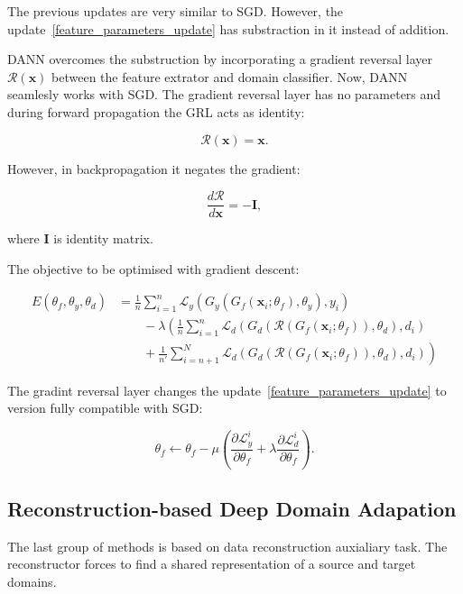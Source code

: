 The previous updates are very similar to SGD.
However, the update~\ref{feature_parameters_update} has substraction in it instead of addition.

DANN overcomes the substruction by incorporating a gradient reversal layer \(\mathcal{R}(\mathbf{x})\) between the feature extrator and domain classifier.
Now, DANN seamlesly works with SGD.
The gradient reversal layer has no parameters
and during forward propagation the GRL acts as identity:

\begin{equation}
	\mathcal{R}(\mathbf{x}) = \mathbf{x}.
\end{equation}

However, in backpropagation it negates the gradient:

\begin{equation}
	\frac{d \mathcal{R}}{d \mathbf{x}} = -\mathbf{I},
\end{equation}

where \(\mathbf{I}\) is identity matrix.

The objective to be optimised with gradient descent:

\begin{align}
	E(\theta_f, \theta_y, \theta_d) &= \frac{1}{n} \sum^{n}_{i = 1} \mathcal{L}_y(G_y(G_f(\mathbf{x}_i; \theta_f), \theta_y), y_i) \nonumber \\
	&\qquad {} - \lambda \left(\frac{1}{n} \sum^{n}_{i = 1} \mathcal{L}_d(G_d(\mathcal{R}(G_f(\mathbf{x}_i; \theta_f)), \theta_d), d_i) \right. \nonumber \\
	&\qquad \left. {} + \frac{1}{n'} \sum^{N}_{i = n + 1} \mathcal{L}_d(G_d(\mathcal{R}(G_f(\mathbf{x}_i; \theta_f)), \theta_d), d_i)\right)
\end{align}

The gradint reversal layer changes the update~\ref{feature_parameters_update}
to version fully compatible with SGD:

\begin{equation}
	\theta_f \gets \theta_f - \mu \left(
	\frac{\partial \mathcal{L}_y^i}{\partial \theta_f}
	+ \lambda \frac{\partial \mathcal{L}_d^i}{\partial \theta_f}
	\right).
\end{equation}

\subsection{Reconstruction-based Deep Domain Adapation}

The last group of methods is based on data reconstruction auxialiary task.
The reconstructor forces to find a shared representation
of a source and target domains.


